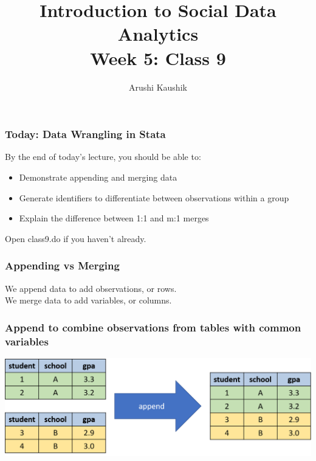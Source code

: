 \documentclass[11pt]{beamer}
\title[Class 9]{Introduction to Social Data Analytics \\
	\bigskip Week 5: Class 9}
\author[Kaushik]{Arushi Kaushik}
\institute[UCSD]{arkaushi@ucsd.edu}
\date[Data Wrangling in Stata- I]{}
\begin{document}
\frame{\titlepage}


\begin{frame}
\frametitle{Today: Data Wrangling in Stata}
By the end of today's lecture, you should be able to: \medskip
\begin{itemize} \itemsep1em
	\item Demonstrate appending and merging data
	\item Generate identifiers to differentiate between observations within a group 
	\item Explain the difference between 1:1 and m:1 merges
\end{itemize} \bigskip
Open class9.do if you haven't already. 
\end{frame}

\begin{frame}
\frametitle{Appending vs Merging}
We \alert{append} data to add observations, or rows. \\ \bigskip
We \alert{merge} data to add variables, or columns. 
\end{frame}

\begin{frame}
\frametitle{Append to combine observations from tables with common variables}
\begin{center}
	\includegraphics[width=\textwidth]{images/append.png}
\end{center} %
\end{frame}
\end{document}
